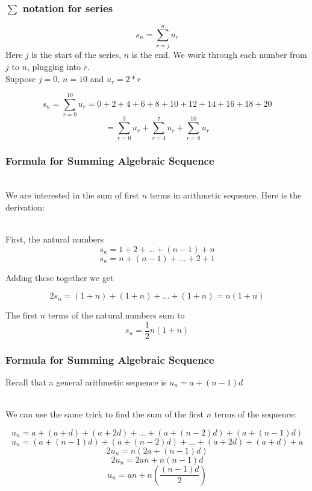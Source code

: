 \documentclass{beamer}
\numberwithin{equation}{section}
\begin{document}
\begin{frame}
\frametitle{$\sum$ notation for series}

$$s_n=\sum_{r=j}^{n}u_r$$
Here $j$ is the start of the series, $n$ is the end.  We work through each number from $j$ to $n$, plugging into $r$.\pause
\vspace{5mm} \\ 
Suppose $j=0$, $n=10$ and $u_r = 2* r$ 

$$s_n=\sum_{r=0}^{10}u_r=0+2+4+6+8+10+12+14+16+18+20$$
$$=\sum_{r=0}^{3}u_r+\sum_{r=4}^{7}u_r+\sum_{r=8}^{10}u_r$$

\end{frame}

\begin{frame}
\frametitle{Formula for Summing Algebraic Sequence}

\ \\We are interested in the sum of first $n$ terms in arithmetic sequence. Here is the derivation: \pause

\ \\First, the natural numbers $$s_n=1+ 2+ ...+(n-1)+  n$$
 $$s_n=n + (n-1) + ...+ 2+ 1$$ \pause
 
 Adding these together we get 
 
 $$2s_n=(1+n)+(1+n)+...+(1+n)= n(1+n)$$ \pause
 
 The first $n$ terms of the natural numbers sum to 
 $$s_n={\frac{1}{2}}n(1+n)$$

\end{frame}



\begin{frame}
\frametitle{Formula for Summing Algebraic Sequence}

Recall that a general arithmetic sequence is $u_n=a+(n-1)d$ \pause

\ \\We can use the same trick to find the sum of the first $n$ terms of the sequence:

$$u_n=a+(a+d)+(a+2d)+...+(a+(n-2)d)+(a+(n-1)d)$$\pause
$$u_n=(a+(n-1)d)+(a+(n-2)d)+...+(a+2d)+(a+d)+a$$\pause
$$2u_n=n\left(2a+(n-1)d\right)$$\pause
$$2u_n=2an+n(n-1)d$$\pause
$$u_n=an+n\left({\frac{(n-1)d}{2}}\right)$$

\end{frame}
\end{document}
